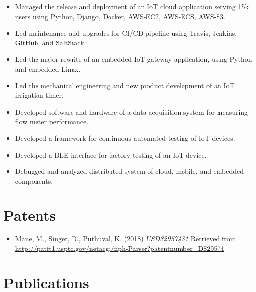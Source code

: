 \documentclass[letterpaper]{article}
\begin{document}
    \begin{itemize}

      \item Managed the release and deployment of an IoT cloud application serving 15k users using Python, Django, Docker, AWS-EC2, AWS-ECS, AWS-S3.
      \item Led maintenance and upgrades for CI/CD pipeline using Travis, Jenkins, GitHub, and SaltStack.
      \item Led the major rewrite of an embedded IoT gateway application, using Python and embedded Linux.
      \item Led the mechanical engineering and new product development of an IoT irrigation timer.
      \item Developed software and hardware of a data acquisition system for measuring flow meter performance.
      \item Developed a framework for continuous automated testing of IoT devices.
      \item Developed a BLE interface for factory testing of an IoT device.
      \item Debugged and analyzed distributed system of cloud, mobile, and embedded components.

    \end{itemize}

\section*{Patents}

  \begin{itemize}
    \item Mane, M., Singer, D., Puthuval, K. (2018) {\it USD829574S1} Retrieved from \href{http://patft1.uspto.gov/netacgi/nph-Parser?patentnumber=D829574}{http://patft1.uspto.gov/netacgi/nph-Parser?patentnumber=D829574}
  \end{itemize}

\section*{Publications}
\end{document}

